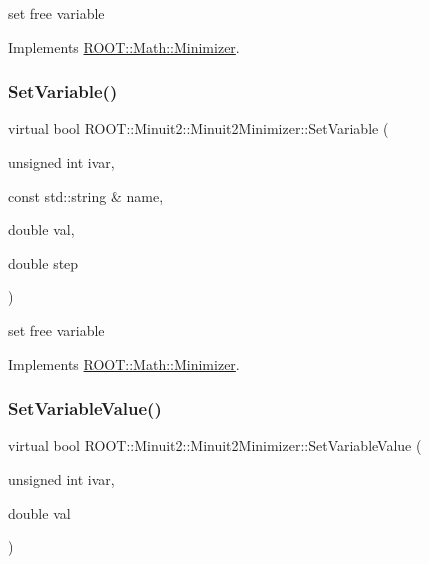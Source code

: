 set free variable 



Implements \mbox{\hyperlink{classROOT_1_1Math_1_1Minimizer_a8661a2ac86372602f32f97b3d9262421}{R\+O\+O\+T\+::\+Math\+::\+Minimizer}}.

\mbox{\label{classROOT_1_1Minuit2_1_1Minuit2Minimizer_a951ad856f74ded3c64836fa28fdf9bb5}} 
\subsubsection{\texorpdfstring{SetVariable()}{SetVariable()}\hspace{0.1cm}{\footnotesize\ttfamily [3/3]}}
{\footnotesize\ttfamily virtual bool R\+O\+O\+T\+::\+Minuit2\+::\+Minuit2\+Minimizer\+::\+Set\+Variable (\begin{DoxyParamCaption}\item[{unsigned int}]{ivar,  }\item[{const std\+::string \&}]{name,  }\item[{double}]{val,  }\item[{double}]{step }\end{DoxyParamCaption})\hspace{0.3cm}{\ttfamily [virtual]}}



set free variable 



Implements \mbox{\hyperlink{classROOT_1_1Math_1_1Minimizer_a8661a2ac86372602f32f97b3d9262421}{R\+O\+O\+T\+::\+Math\+::\+Minimizer}}.

\mbox{\label{classROOT_1_1Minuit2_1_1Minuit2Minimizer_a474e05b30c1227e9cc39fb597027f426}} 
\subsubsection{\texorpdfstring{SetVariableValue()}{SetVariableValue()}\hspace{0.1cm}{\footnotesize\ttfamily [1/3]}}
{\footnotesize\ttfamily virtual bool R\+O\+O\+T\+::\+Minuit2\+::\+Minuit2\+Minimizer\+::\+Set\+Variable\+Value (\begin{DoxyParamCaption}\item[{unsigned int}]{ivar,  }\item[{double}]{val }\end{DoxyParamCaption})\hspace{0.3cm}{\ttfamily [virtual]}}



